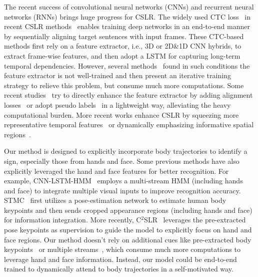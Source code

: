 \documentclass[10pt,twocolumn,letterpaper]{article}
\begin{document}
The recent success of convolutional neural networks (CNNs) and recurrent neural networks (RNNs) brings huge progress for CSLR.  The widely used CTC loss~\cite{graves2006connectionist} in recent CSLR methods~\cite{pu2019iterative,pu2020boosting,cheng2020fully,cui2019deep,niu2020stochastic,Min_2021_ICCV} enables training deep networks in an end-to-end manner by sequentially aligning target sentences with input frames. These CTC-based methods first rely on a feature extractor, i.e., 3D or 2D\&1D CNN hybrids, to extract frame-wise features, and then adopt a LSTM for capturing long-term temporal dependencies. However, several methods~\cite{pu2019iterative,cui2019deep} found in such conditions the feature extractor is not well-trained and then present an iterative training strategy to relieve this problem, but consume much more computations. Some recent studies~\cite{Min_2021_ICCV,cheng2020fully,hao2021self} try to directly enhance the feature extractor by adding alignment losses~\cite{Min_2021_ICCV,hao2021self} or adopt pseudo labels~\cite{cheng2020fully} in a lightweight way, alleviating the heavy computational burden. More recent works enhance CSLR by squeezing more representative temporal features~\cite{hu2022temporal} or dynamically emphasizing informative spatial regions~\cite{hu2023self}.

Our method is designed to explicitly incorporate body trajectories to identify a sign, especially those from hands and face. Some previous methods have also explicitly leveraged the hand and face features for better recognition. For example, CNN-LSTM-HMM~\cite{koller2019weakly} employs a multi-stream HMM (including hands and face) to integrate multiple visual inputs to improve recognition accuracy. STMC~\cite{zhou2020spatial} first utilizes a pose-estimation network to estimate human body keypoints and then sends cropped appearance regions (including hands and face) for information integration. More recently, C$^2$SLR~\cite{zuo2022c2slr} leverages the pre-extracted pose keypoints as supervision to guide the model to explicitly focus on hand and face regions. Our method doesn't rely on additional cues like pre-extracted body keypoints~\cite{zuo2022c2slr} or multiple streams~\cite{koller2019weakly}, which consume much more computations to leverage hand and face information. Instead, our model could be end-to-end trained to dynamically attend to body trajectories in a self-motivated way.
\end{document}
